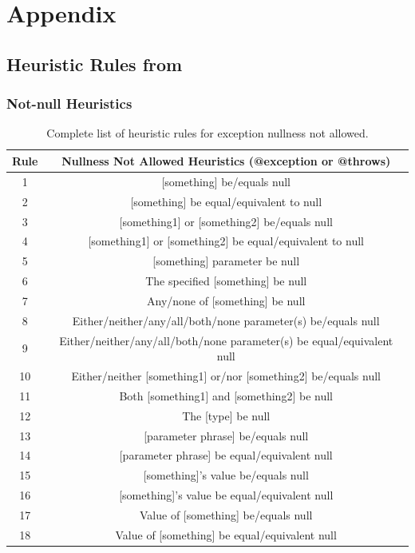 \chapter{Appendix}
\section{Heuristic Rules from \cite{zhou-directive}}
\subsection{Not-null Heuristics}
\label{app:not-null}
\begin{table}[h]
	\centering
	\begin{tabular}{|c|c|}
		\hline
		\textbf{Rule} & \textbf{Nullness Not Allowed Heuristics (@exception or @throws)} \\ \hline
		1 & [something] be/equals null \\ \hline
		2 & [something] be equal/equivalent to null \\ \hline
		3 & [something1] or [something2] be/equals null \\ \hline
		4 & [something1] or [something2] be equal/equivalent to null \\ \hline
		5 & [something] parameter be null \\ \hline
		6 & The specified [something] be null \\ \hline
		7 & Any/none of [something] be null \\ \hline
		8 & Either/neither/any/all/both/none parameter(s) be/equals null \\ \hline
		9 & Either/neither/any/all/both/none parameter(s) be equal/equivalent null \\ \hline
		10 & Either/neither [something1] or/nor [something2] be/equals null \\ \hline
		11 & Both [something1] and [something2] be null \\ \hline
		12 & The [type] be null \\ \hline
		13 & [parameter phrase] be/equals null \\ \hline
		14 & [parameter phrase] be equal/equivalent null \\ \hline
		15 & [something]’s value be/equals null \\ \hline
		16 & [something]’s value be equal/equivalent null \\ \hline
		17 & Value of [something] be/equals null \\ \hline
		18 & Value of [something] be equal/equivalent null \\ \hline
	\end{tabular}
	\caption{Complete list of heuristic rules for exception nullness not allowed.}
	\label{tab:complete-not-null-heuristic-except}
\end{table}

